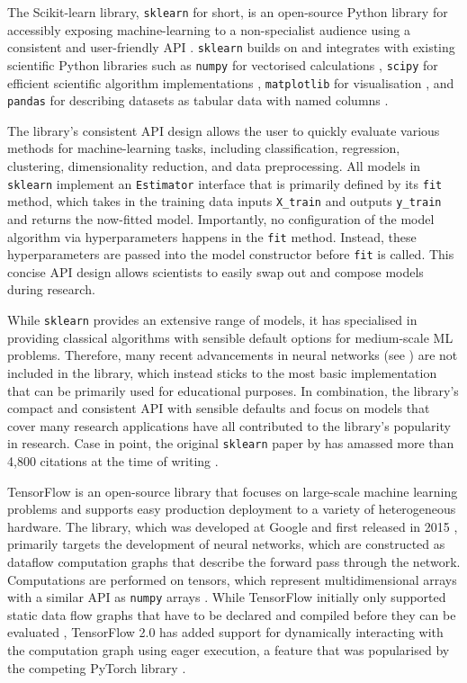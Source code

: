 \newpar The Scikit-learn library, \texttt{sklearn} for short, is an open-source Python library for accessibly exposing machine-learning to a non-specialist audience \cite{scikit-learn-2011} using a consistent and user-friendly API \cite{sklearn-api-2013}. \texttt{sklearn} builds on and integrates with existing scientific Python libraries such as \texttt{numpy} for vectorised calculations \cite{numpy-2020}, \texttt{scipy} for efficient scientific algorithm implementations \cite{scipy-2020}, \texttt{matplotlib} for visualisation \cite{matplotlib-2007}, and \texttt{pandas} for describing datasets as tabular data with named columns \cite{pandas-2010, pandas-software-2020}.

The library's consistent API design allows the user to quickly evaluate various methods for machine-learning tasks, including classification, regression, clustering, dimensionality reduction, and data preprocessing. All models in \texttt{sklearn} implement an \texttt{Estimator} interface that is primarily defined by its \texttt{fit} method, which takes in the training data inputs \texttt{X\_train} and outputs \texttt{y\_train} and returns the now-fitted model. Importantly, no configuration of the model algorithm via hyperparameters happens in the \texttt{fit} method. Instead, these hyperparameters are passed into the model constructor before \texttt{fit} is called. This concise API design allows scientists to easily swap out and compose models during research.

While \texttt{sklearn} provides an extensive range of models, it has specialised in providing classical algorithms with sensible default options for medium-scale ML problems. Therefore, many recent advancements in neural networks (see ) are not included in the library, which instead sticks to the most basic implementation that can be primarily used for educational purposes. In combination, the library's compact and consistent API with sensible defaults and focus on models that cover many research applications have all contributed to the library's popularity in research. Case in point, the original \texttt{sklearn} paper by \textcite{scikit-learn-2011} has amassed more than 4,800 citations at the time of writing \cite{scikit-learn-2011}.

\newpar TensorFlow is an open-source library that focuses on large-scale machine learning problems and supports easy production deployment to a variety of heterogeneous hardware. The library, which was developed at Google and first released in 2015 \cite{tensorflow-whitepaper-2015}, primarily targets the development of neural networks, which are constructed as dataflow computation graphs that describe the forward pass through the network. Computations are performed on tensors, which represent multidimensional arrays with a similar API as \texttt{numpy} arrays \cite{numpy-2020}. While TensorFlow initially only supported static data flow graphs that have to be declared and compiled before they can be evaluated \cite{tensorflow-whitepaper-2015}, TensorFlow 2.0 has added support for dynamically interacting with the computation graph using eager execution, a feature that was popularised by the competing PyTorch library \cite{pytorch-2019}.

